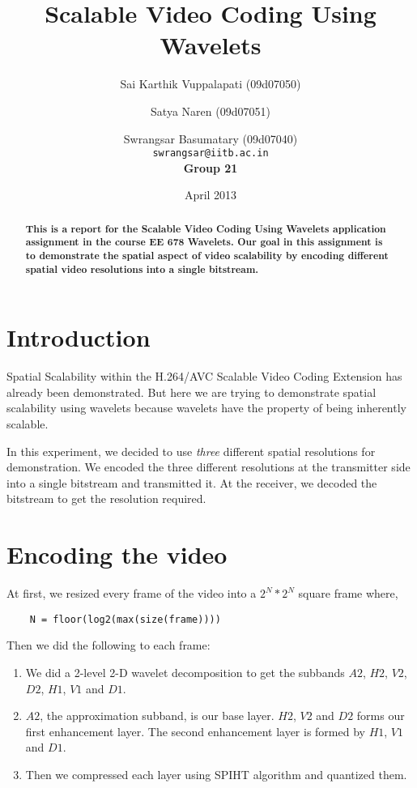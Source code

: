 \documentclass[10pt,twocolumn]{article}
\title{Scalable Video Coding Using Wavelets}
\author{Sai Karthik Vuppalapati (09d07050) \and Satya Naren (09d07051) \and Swrangsar Basumatary (09d07040) \\
\texttt{swrangsar@iitb.ac.in} \\
\textbf{Group 21}}
\date{April 2013}
\begin{document}
\maketitle

\begin{abstract}
    \textbf{This is a report for the Scalable Video Coding Using Wavelets application assignment in the course EE 678 Wavelets. Our goal in this assignment is to demonstrate the spatial aspect of video scalability by encoding different spatial video resolutions into a single bitstream.}
\end{abstract}

\section{Introduction}

Spatial Scalability within the H.264/AVC Scalable Video Coding Extension has already been demonstrated\cite{segall2007}. But here we are trying to demonstrate spatial scalability using wavelets because wavelets have the property of being inherently scalable.

In this experiment, we decided to use \emph{three} different spatial resolutions for demonstration. We encoded the three different resolutions at the transmitter side into a single bitstream and transmitted it. At the receiver, we decoded the bitstream to get the resolution required.

\section{Encoding the video}

At first, we resized every frame of the video into a $2^N * 2^N$ square frame where,
\begin{verbatim}
    N = floor(log2(max(size(frame))))
\end{verbatim}

Then we did the following to each frame:
\begin{enumerate}
    \item We did a 2-level 2-D wavelet decomposition to get the subbands $A2$, $H2$, $V2$, $D2$, $H1$, $V1$ and $D1$.
    \item $A2$, the approximation subband, is our base layer. $H2$, $V2$ and $D2$ forms our first enhancement layer. The second enhancement layer is formed by $H1$, $V1$ and $D1$.
    \item Then we compressed each layer using SPIHT\cite{amirSaid1996} algorithm and quantized them.
\end{enumerate}
\end{document}

